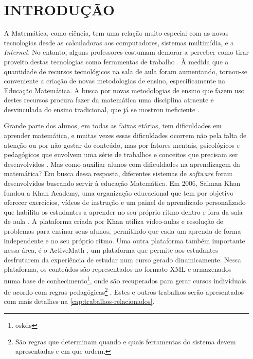 \chapter{INTRODUÇÃO}
\label{cap:introducao}

A Matemática, como ciência, tem uma relação muito especial com as novas tecnologias desde as calculadoras aos computadores, sistemas 
multim\'idia, e a \textit{Internet}. No entanto, alguns professores costumam demorar a perceber como tirar proveito destas tecnologias como 
ferramentas de trabalho \cite{da1997ensino}. \`A medida que a quantidade de recursos tecnológicos na sala de aula foram aumentando, 
tornou-se conveniente a criação de novas metodologias de ensino, especificamente na Educação Matemática. A busca por novas 
metodologias de ensino que fazem uso destes recursos procura fazer da matemática uma disciplina atraente e desvinculada do ensino 
tradicional, que já se mostrou ineficiente \cite{silva2009ambiente}.

Grande parte dos alunos, em todas as faixas etárias, tem dificuldades em aprender matemática, e muitas vezes essas dificuldades ocorrem 
não pela falta de atenção ou por não gostar do conteúdo, mas por fatores mentais, psicológicos e pedag\'ogicos que envolvem uma série de 
trabalhos e conceitos que 
precisam ser desenvolvidos \cite{de2006dificuldades}. Mas como auxiliar alunos com dificuldades na aprendizagem da matemática? Em busca 
dessa resposta, diferentes sistemas de \textit{software} foram desenvolvidos buscando servir \`a  educação Matem\'atica. Em 2006, Salman 
Khan fundou a Khan Academy, uma organização educacional que tem por objetivo oferecer exercícios, vídeos de instrução e um painel de 
aprendizado personalizado que habilita os estudantes a aprender no seu próprio ritmo dentro e fora da sala de aula \cite{khan2012one}. A 
plataforma criada por Khan utiliza vídeo-aulas e resolução de problemas para ensinar seus alunos, permitindo que cada um aprenda de forma 
independente e no seu pr\'oprio ritmo. Uma outra plataforma também  importante nessa área, \'e o ActiveMath 
\cite{melis2001activemath}, um plataforma que permite aos estudantes desfrutarem da experiência de estudar num 
curso gerado dinamicamente. Nessa plataforma, os conte\'udos s\~ao representados no formato XML \cite{bray1998extensible} e armazenados 
numa base de conhecimento\footnote{oskds}, onde s\~ao recuperados para gerar cursos individuais de acordo com regras 
pedagógicas\footnote{S\~ao regras que determinam quando e quais ferramentas do sistema devem apresentadas e em que ordem.} 
\cite{melis2004activemath}. Estes e outros trabalhos serão apresentados com mais detalhes na \autoref{cap:trabalhos-relacionados}.

